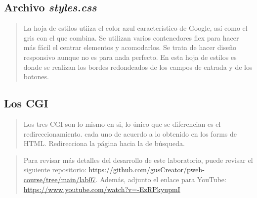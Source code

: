 \documentclass{article}
\begin{document}
  \subsection{Archivo \textit{styles.css}}

  

  \begin{quote}
    La hoja de estilos utiiza el color azul característico de Google, así como el gris con el que combina. Se utilizan varios contenedores flex para hacer más fácil el centrar elementos y acomodarlos. Se trata de hacer diseño responsivo aunque no es para nada perfecto. En esta hoja de estilos es donde se realizan los bordes redondeados de los campos de entrada y de los botones.
  \end{quote}

  \subsection{Los CGI}

  
  
  

  \begin{quote}
    Los tres CGI son lo mismo en si, lo único que se diferencian es el redireccionamiento. cada uno de acuerdo a lo obtenido en los forms de HTML. Redirecciona la página hacia la de búsqueda.
  \end{quote}

  \begin{quotation}
    Para revisar más detalles del desarrollo de este laboratorio, puede revisar el siguiente repositorio: \url{https://github.com/gusCreator/pweb-course/tree/main/lab07}. Además, adjunto el enlace para YouTube: \url{https://www.youtube.com/watch?v=-EzRPkyupmI}
  \end{quotation}

\clearpage
	
%
%
%
			
\end{document}
